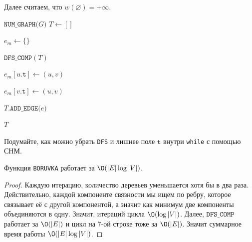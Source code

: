 Далее считаем, что $w(\varnothing) = +\infty$.

\begin{algorithm}[H]
\caption{Алгоритм Борувки}
\begin{algorithmic}[1]

    \State $\texttt{NUM\_GRAPH(}G\texttt{)}$
    \State $T \gets []$

     
        \State $e_m \gets \{\}$ 
        
        \State $\texttt{DFS\_COMP}(T)$

             
                    \State $e_m[u\texttt{.t}] \gets (u, v)$
                \EndIf

                    \State $e_m[v\texttt{.t}] \gets (u, v)$
                \EndIf
            \EndIf
        \EndFor

         
            \State $T\texttt{.ADD\_EDGE(}e\texttt{)}$
        \EndFor
    \EndWhile

    \State \Return $T$
\EndFunction
\end{algorithmic}
\end{algorithm}

\Exe Подумайте, как можно убрать \texttt{DFS} и лишнее поле $\texttt{t}$ внутри \texttt{while} с помощью СНМ. 

\St Функция \texttt{BORUVKA} работает за $\O(|E| \log |V|)$.
\begin{proof}

    Каждую итерацию, количество деревьев уменьшается хотя бы в два раза. Действительно, каждой компоненте связности мы ищем по ребру, которое связывает её с другой компонентой, а значит как минимум две компоненты объединяются в одну.
    Значит, итераций цикла $\O(\log |V|)$. Далее, $\texttt{DFS\_COMP}$ работает за $\O(|E|)$ и цикл на 7-ой строке тоже за $\O(|E|)$. Значит суммарное время работы $\O(|E| \log |V|)$.

\end{proof}

